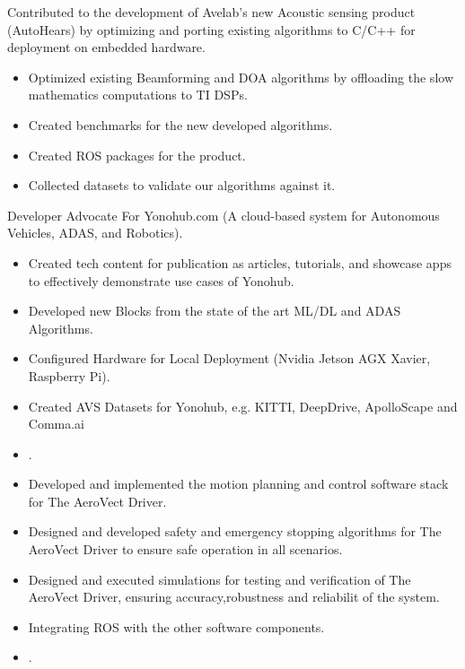 \documentclass[10pt,a4paper,ragged2e]{altacv}
\begin{document}
\divider

Contributed to the development of Avelab's new Acoustic sensing product (AutoHears) by optimizing and porting existing algorithms to C/C++ for deployment on embedded hardware. 
\begin{itemize}
\item Optimized existing Beamforming and DOA algorithms by offloading the slow mathematics computations to TI DSPs.
\item Created benchmarks for the new developed algorithms.
\item Created ROS packages for the product.
\item Collected datasets to validate our algorithms against it.
\end{itemize}
Developer Advocate For Yonohub.com (A cloud-based system for Autonomous Vehicles,
ADAS, and Robotics).
\begin{itemize}
\item  Created tech content for publication as articles, tutorials, and showcase apps to
effectively demonstrate use cases of Yonohub.
\item Developed new Blocks from the state of the art ML/DL and ADAS Algorithms.
\item Configured Hardware for Local Deployment (Nvidia Jetson AGX Xavier, Raspberry Pi).
\item Created AVS Datasets for Yonohub, e.g. KITTI, DeepDrive, ApolloScape and Comma.ai
	\item {}.
\end{itemize}
\divider

\begin{itemize}
\item Developed and implemented the motion planning and control software stack for The AeroVect Driver.
\item Designed and developed safety and emergency stopping algorithms for The AeroVect Driver to ensure safe operation in all scenarios. 
\item Designed and executed simulations for testing and verification of The AeroVect Driver, ensuring accuracy,robustness and reliabilit of the system.
\item Integrating ROS with the other software components.
	\item {}.

\end{itemize}
\end{document}
